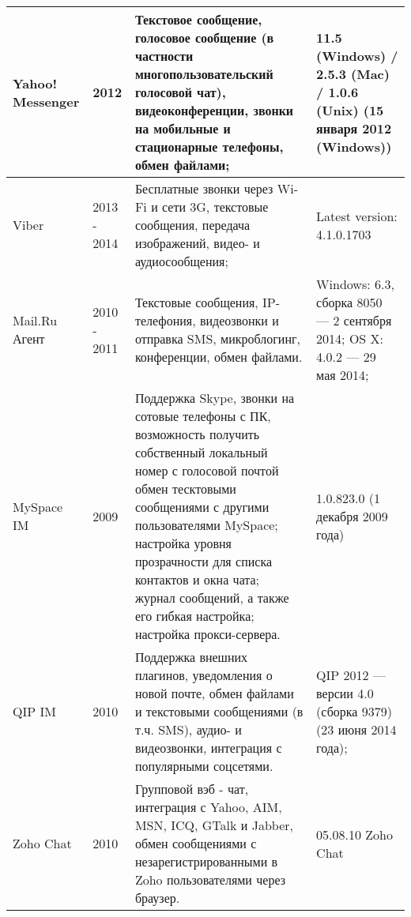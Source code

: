 \begin{center}
\begin{longtable}{|p{2cm}|p{2cm}|p{7cm}|p{5cm}|}
\hline
Yahoo! Messenger &
2012 &
Текстовое сообщение, голосовое сообщение (в частности многопользовательский голосовой чат), видеоконференции, звонки на мобильные и стационарные телефоны, обмен файлами; &
11.5 (Windows) / 2.5.3 (Mac) / 1.0.6 (Unix) (15 января 2012 (Windows)) \\
\hline
Viber &
2013 - 2014 &
Бесплатные звонки через Wi-Fi и сети 3G, текстовые сообщения, передача изображений, видео- и аудиосообщения; &
Latest version:
4.1.0.1703 \\
\hline
Mail.Ru Агент &
2010 - 2011 &
Текстовые сообщения, IP-телефония, видеозвонки и отправка SMS,  микроблогинг, конференции, обмен файлами. &
Windows: 6.3, сборка 8050 — 2 сентября 2014;
OS X: 4.0.2 — 29 мая 2014; \\
\hline
MySpace IM &
2009 &
Поддержка Skype, 
звонки на сотовые телефоны с ПК, возможность получить собственный локальный номер с голосовой почтой
обмен тесктовыми сообщениями с другими пользователями MySpace;
настройка уровня прозрачности для списка контактов и окна чата;
журнал сообщений, а также его гибкая настройка;
настройка прокси-сервера. &
1.0.823.0 (1 декабря 2009 года) \\
\hline
QIP IM  &
2010 &
Поддержка внешних плагинов, уведомления о новой почте, обмен файлами и текстовыми сообщениями (в т.ч. SMS), аудио- и видеозвонки,
интеграция с популярными соцсетями. &
QIP 2012 — версии 4.0 (сборка 9379) (23 июня 2014 года); \\
\hline
Zoho Chat &
2010 &
Групповой вэб - чат, интеграция с Yahoo, AIM, MSN, ICQ, GTalk и Jabber, обмен сообщениями с незарегистрированными в Zoho пользователями через браузер. &
05.08.10 Zoho Chat \\
\hline
\end{longtable}
\end{center}
